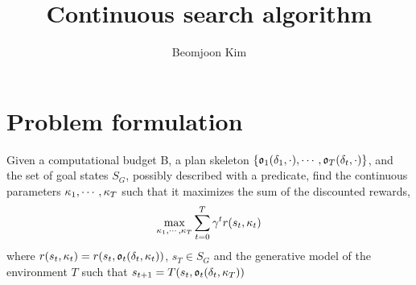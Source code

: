\documentclass[10pt,letterpaper]{article}
\author{Beomjoon Kim}
\title{Continuous search algorithm}
\begin{document}
\maketitle
\section{Problem formulation}
Given a computational budget B,
a plan skeleton $\{\mathfrak{o}_1(\delta_1,\cdot),\cdots,\mathfrak{o}_T(\delta_t,\cdot)\}$, 
and the set of goal states $S_G$, possibly described with a predicate,
find the continuous parameters $\kappa_1,\cdots,\kappa_T$ such that it maximizes
the sum of the discounted rewards,
$$ \max_{\kappa_1,\cdots,\kappa_T}  \sum_{t=0}^{T
}  \gamma^t r(s_t,\kappa_t)  $$
where $r(s_t,\kappa_t) = r(s_t,\mathfrak{o}_t(\delta_t,\kappa_t) )$, $s_T \in S_G$ and
the generative model of the environment $T$ such that $s_{t+1} = T(s_t,\mathfrak{o}_t(\delta_t,\kappa_T))$







\end{document}

